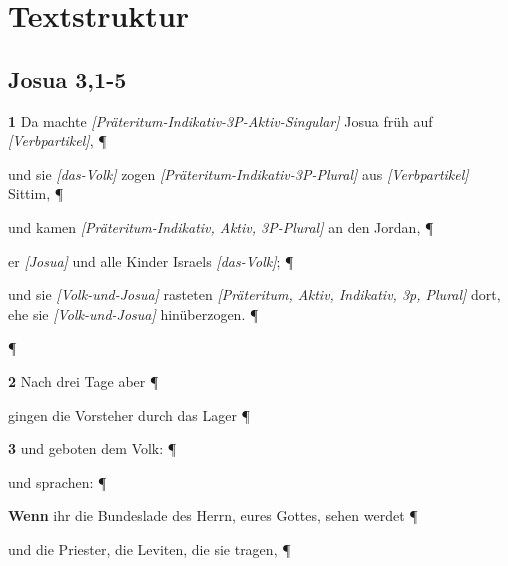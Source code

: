 \documentclass[12pt,a4paper]{article}
\newcommand{\verbstamm}[1]{\textcolor{verbcolor}{#1}}
\newcommand{\verbpart}[1]{\textcolor{prepcolor}{#1}}
\newcommand{\nomen}[1]{\textcolor{nouncolor}{#1}}
\newcommand{\konj}[1]{\textcolor{conjcolor}{#1}}
\newcommand{\prep}[1]{\textcolor{prepcolor}{#1}}
\newcommand{\partikel}[1]{\textcolor{prepcolor}{#1}}
\newcommand{\plural}[1]{\textcolor{pluralcolor}{#1}}
\newcommand{\ort}[1]{\textcolor{locationcolor}{#1}}
\newcommand{\annot}[1]{{\footnotesize\textit{[#1]}}}
\begin{document}
\section*{Textstruktur}

\subsection*{Josua 3,1-5}

\textbf{1} \konj{Da} \verbstamm{machte} \annot{Präteritum-Indikativ-3P-Aktiv-Singular} \nomen{Josua} \partikel{früh} \verbpart{auf} \annot{Verbpartikel}, ¶

\hspace*{1cm} \konj{und} \plural{sie} \annot{das-Volk} \verbstamm{zogen} \annot{Präteritum-Indikativ-3P-Plural} \prep{aus} \annot{Verbpartikel} \plural{Sittim}, ¶

\hspace*{1cm} \konj{und} \verbstamm{kamen} \annot{Präteritum-Indikativ, Aktiv, 3P-Plural} \prep{an} \prep{den} \nomen{Jordan}, ¶

\hspace*{2cm} er \annot{Josua} \konj{und} \plural{alle} \nomen{Kinder} \nomen{Israels} \annot{das-Volk}; ¶

\hspace*{2cm} \konj{und} \plural{sie} \annot{Volk-und-Josua} \verbstamm{rasteten} \annot{Präteritum, Aktiv, Indikativ, 3p, Plural} \ort{dort}, \konj{ehe} \plural{sie} \annot{Volk-und-Josua} \verbstamm{hinüberzogen}. ¶

¶

\textbf{2} \konj{Nach} \prep{drei} \nomen{Tage} \konj{aber} ¶

\hspace*{1cm} \verbstamm{gingen} \prep{die} \nomen{Vorsteher} \prep{durch} \prep{das} \ort{Lager} ¶

\hspace*{2cm} \textbf{3} \konj{und} \verbstamm{geboten} \prep{dem} \nomen{Volk}: ¶

\hspace*{2cm} \konj{und} \verbstamm{sprachen}: ¶

\hspace*{3cm} \textbf{Wenn} \prep{ihr} \prep{die} \nomen{Bundeslade} \prep{des} \nomen{Herrn}, \partikel{eures} \nomen{Gottes}, \verbstamm{sehen} \verbstamm{werdet} ¶

\hspace*{4cm} \konj{und} \prep{die} \nomen{Priester}, \prep{die} \nomen{Leviten}, \prep{die} \plural{sie} \verbstamm{tragen}, ¶
\end{document}

